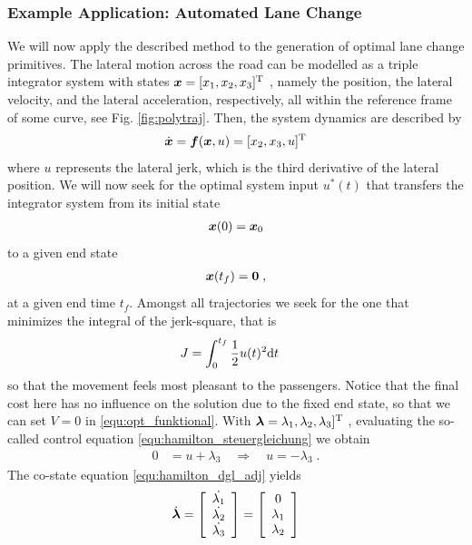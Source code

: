 \subsubsection{Example Application: Automated Lane Change}\label{S:57.3.1.2}
We will now apply the described method to the generation of optimal lane change primitives. The lateral motion across the road can be modelled as a triple integrator system with states $\bs x = [x_1, x_2, x_3]^\T$ , namely the position, the lateral velocity, and the lateral acceleration, respectively, all within the reference frame of some curve, see Fig. \ref{fig:polytraj}.
Then, the system dynamics are described by 
\begin{align}
	\dot{\bs x} = \bs f(\bs x, u) = [x_2, x_3, u ]^\T
	\label{equ:stateeqlc}
\end{align}
where $u$ represents the lateral jerk, which is the third derivative of the lateral position. We will now seek for the optimal system input $u^* (t)$  that transfers the integrator system from its initial state
\begin{align}
	\bs x(0) = \bs x_0 \label{equ:x_0}
\end{align}
to a given end state 
\begin{align}
\bs x(t_f) = \bs 0 \;, \label{equ:x_f}
\end{align}
at a given end time $t_f$. Amongst all trajectories we seek for the one that minimizes the integral of the jerk-square, that is
\begin{align}
	J &= %
	\int_{0}^{t_f}\frac{1}{2} u(t)^2 {\rm d} t \label{equ:integrator_J}
\end{align}
so that the movement feels most pleasant to the passengers. Notice that the final cost here has no influence on the solution due to the fixed end state, so that we can set $V=0$ in \eqref{equ:opt_funktional}.
With $\bs \lambda =\lambda_1, \lambda_2, \lambda_3]^\T$ , evaluating the so-called control equation \eqref{equ:hamilton_steuergleichung} we obtain
\begin{align}
	0 &=  u + \lambda_3 \quad \Rightarrow \quad u = -\lambda_3 \;. \label{equ:integrator_u}
\end{align}
The co-state equation \eqref{equ:hamilton_dgl_adj} yields
\begin{align*}
	\dot {\bs \lambda} = 
	\mtrx{c}{\dot{\lambda_1} \\ \dot{\lambda_2} \\ \dot{\lambda_3}}=
	\mtrx{c}{0 \\ \lambda_1 \\ \lambda_2}
\end{align*}
